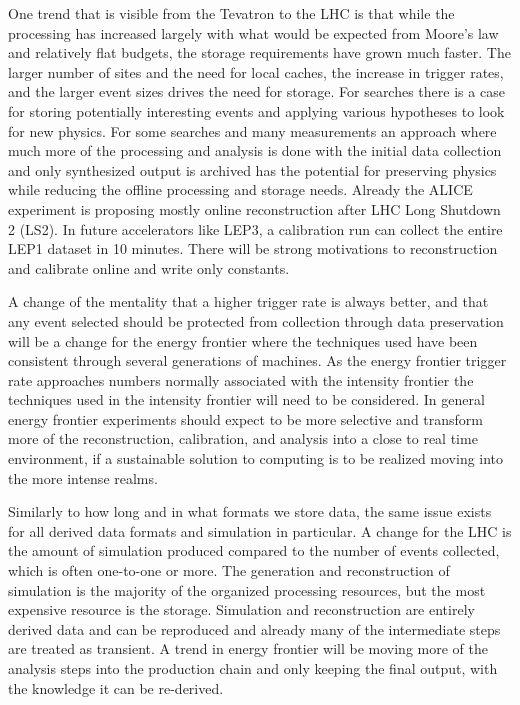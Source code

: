 One trend that is visible from the Tevatron to the LHC is that while the processing has increased largely with what would be expected from Moore's law and relatively flat budgets, the storage requirements have grown much faster.   The larger number of sites and the need for local caches, the increase in trigger rates, and the larger event sizes drives the need for storage.   For searches there is a case for storing potentially interesting events and applying various hypotheses to look for new physics.   For some searches and many measurements an approach where much more of the processing and analysis is done with the initial data collection and only synthesized output is archived has the potential for preserving physics while reducing the offline processing and storage needs.   Already the ALICE experiment is proposing mostly online reconstruction after LHC Long Shutdown 2 (LS2).   In future accelerators like LEP3, a calibration run can collect the entire LEP1 dataset in 10 minutes.   There will be strong motivations to reconstruction and calibrate online and write only constants.  

A change of the mentality that a higher trigger rate is always better, and that any event selected should be protected from collection through data preservation will be a change for the energy frontier where the techniques used have been consistent through several generations of machines.   As the energy frontier trigger rate approaches numbers normally associated with the intensity frontier the techniques used in the intensity frontier will need to be considered.   In general energy frontier experiments should expect to be more selective and transform more of the reconstruction, calibration, and analysis into a close to real time environment, if a sustainable solution to computing is to be realized moving into the more intense realms.

Similarly to how long and in what formats we store data, the same issue exists for all derived data formats and simulation in particular.    A change for the LHC is the amount of simulation produced compared to the number of events collected, which is often one-to-one or more.   The generation and reconstruction of simulation is the majority of the organized processing resources, but the most expensive resource is the storage.   Simulation and reconstruction are entirely derived data and can be reproduced and already many of the intermediate steps are treated as transient.    A trend in energy frontier will be moving more of the analysis steps into the production chain and only keeping the final output, with the knowledge it can be re-derived.  


